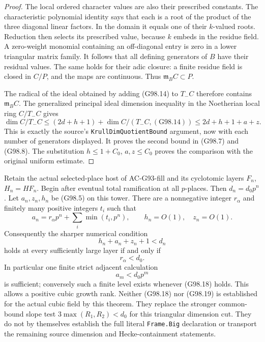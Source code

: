 \begin{proof}
The local ordered character values are also their prescribed
constants.  The characteristic polynomial identity says that
each is a root of the product of the three diagonal linear factors.
In the domain it equals one of their $k$-valued roots.  Reduction
then selects its prescribed value, because $k$ embeds in the residue
field.  A zero-weight monomial containing an off-diagonal entry
is zero in a lower triangular matrix family.  It follows that
all defining generators of $B$ have their residual values.
The same holds for their adic closure: a finite residue field is
closed in $C/P$, and the maps are continuous.
Thus $\mathfrak m_BC\subset P$.

The radical of the ideal obtained by adding (G98.14) to $T_-C$
therefore contains $\mathfrak m_BC$.
The generalized principal ideal dimension inequality in the
Noetherian local ring $C/T_-C$ gives
\[
 \dim C/T_-C
 \le (2d+h+1)+\dim C/(T_-C,(\mathrm{G98.14}))
 \le 2d+h+1+a+z.
 \tag{G98.15}
\]
This is exactly the source's \texttt{KrullDimQuotientBound}
argument, now with each number of generators displayed.
It proves the second bound in (G98.7) and (G98.8).
The substitution $h\le1+C_0$, $a,z\le C_0$ proves the
comparison with the original uniform estimate.
\end{proof}

\begin{theorem}
\label{thm:ACG98slope}
Retain the actual selected-place host of AC-G93-fill and its
cyclotomic layers $F_n$, $H_n=HF_n$.  Begin after eventual total
ramification at all $p$-places.  Then $d_n=d_0p^n$.
Let $a_n,z_n,h_n$ be (G98.5) on this tower.
There are a nonnegative integer $r_\alpha$ and finitely many
positive integers $t_i$ such that
\[
 a_n=r_\alpha p^n+\sum_i\min(t_i,p^n),\qquad
                   h_n=O(1),\quad z_n=O(1).
 \tag{G98.16}
\]
Consequently the sharper numerical condition
\[
                     h_n+a_n+z_n+1<d_n          \tag{G98.17}
\]
holds at every sufficiently large layer if and only if
\[
                             r_\alpha<d_0.      \tag{G98.18}
\]
In particular one finite strict adjacent calculation
\[
                            a_m<d_0p^m          \tag{G98.19}
\]
is sufficient; conversely such a finite level exists whenever
(G98.18) holds.  This allows a positive cubic growth rank.
Neither (G98.18) nor (G98.19) is established for the actual cubic
field by this theorem.  They replace the stronger common-bound
slope test $3\max(R_1,R_2)<d_0$ for this triangular dimension cut.
They do not by themselves establish the full literal
\texttt{Frame.Big} declaration or transport the remaining source
dimension and Hecke-containment statements.
\end{theorem}


